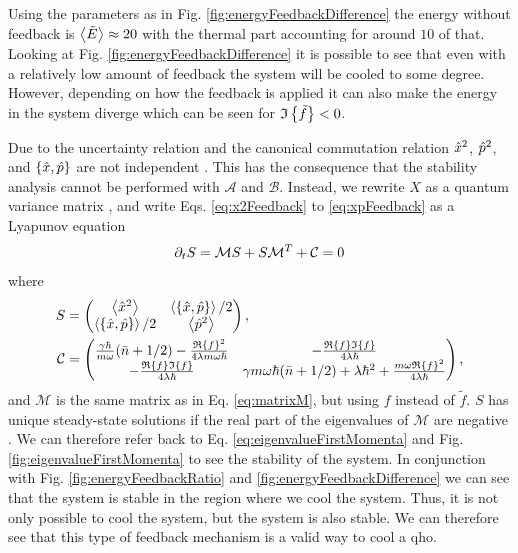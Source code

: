 Using the parameters as in Fig. \ref{fig:energyFeedbackDifference} the energy without feedback is $\expval{\tilde{E}} \approx 20$ with the thermal part accounting for around $10$ of that. Looking at Fig. \ref{fig:energyFeedbackDifference} it is possible to see that even with a relatively low amount of feedback the system will be cooled to some degree. However, depending on how the feedback is applied it can also make the energy in the system diverge which can be seen for $\mathfrak{I}\left\{\tilde{f}\right\} < 0$.

Due to the uncertainty relation and the canonical commutation relation $\hat{x}^2$, $\hat{p}^2$, and $\acomm{\xop}{\pop}$ are not independent \cite{Simon:1994}. This has the consequence that the stability analysis cannot be performed with $\mathcal{A}$ and $\mathcal{B}$. Instead, we rewrite $X$ as a quantum variance matrix \cite{Simon:1994}, and write Eqs. \eqref{eq:x2Feedback} to \eqref{eq:xpFeedback} as a Lyapunov equation
\begin{equation}
    \partial_t S = \mathcal{M} S + S \mathcal{M}^T  + \mathcal{C} = 0
\end{equation}
where 
\begin{align}
    S &= 
    \begin{pmatrix}
    \expval{\xop^2} & \expval{\acomm{\xop}{\pop}}/2\\
    \expval{\acomm{\xop}{\pop}}/2 & \expval{\pop^2}    
    \end{pmatrix},
    \\
    \mathcal{C} &=
    \begin{pmatrix}
        \frac{\gamma \hbar}{m \omega} (\nbar + 1/2) - \frac{\re{f}^2}{4\lambda m \omega \hbar} & -\frac{\re{f} \im{f}}{4 \lambda \hbar}\\
        -\frac{\re{f} \im{f}}{4 \lambda \hbar} & \gamma m \omega \hbar (\nbar + 1/2) + \lambda \hbar^2 +\frac{m \omega \re{f}^2}{4 \lambda \hbar}
    \end{pmatrix},
\end{align}
and $\mathcal{M}$ is the same matrix as in Eq. \eqref{eq:matrixM}, but using $f$ instead of $\tilde{f}$. $S$ has unique steady-state solutions if the real part of the eigenvalues of $\mathcal{M}$ are negative \cite{Purkayastha:2022}. We can therefore refer back to Eq. \eqref{eq:eigenvalueFirstMomenta} and Fig. \ref{fig:eigenvalueFirstMomenta} to see the stability of the system. In conjunction with Fig. \ref{fig:energyFeedbackRatio} and \ref{fig:energyFeedbackDifference} we can see that the system is stable in the region where we cool the system. Thus, it is not only possible to cool the system, but the system is also stable. We can therefore see that this type of feedback mechanism is a valid way to cool a \gls{qho}.